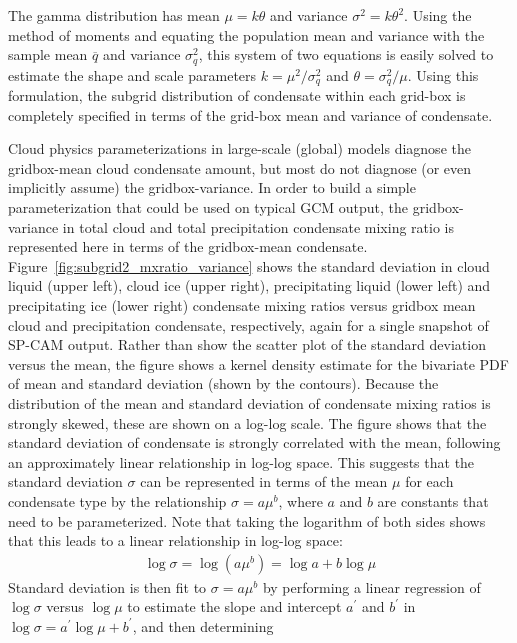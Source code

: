 The gamma distribution has mean \(\mu = k\theta\) and variance
\(\sigma^2 = k \theta^2\). Using the method of moments
\citep[e.g.;][]{wilks_2011} and equating the population mean and
variance with the sample mean \(\overline{q}\) and variance
\(\sigma_q^2\), this system of two equations is easily solved to
estimate the shape and scale parameters \(k = \mu^2 / \sigma_q^2\) and
\(\theta = \sigma_q^2 / \mu\). Using this formulation, the subgrid
distribution of condensate within each grid-box is completely specified
in terms of the grid-box mean and variance of condensate.

Cloud physics parameterizations in large-scale (global) models diagnose
the gridbox-mean cloud condensate amount, but most do not diagnose (or
even implicitly assume) the gridbox-variance. In order to build a simple
parameterization that could be used on typical GCM output, the
gridbox-variance in total cloud and total precipitation condensate
mixing ratio is represented here in terms of the gridbox-mean
condensate. Figure~\ref{fig:subgrid2_mxratio_variance} shows the
standard deviation in cloud liquid (upper left), cloud ice (upper
right), precipitating liquid (lower left) and precipitating ice (lower
right) condensate mixing ratios versus gridbox mean cloud and
precipitation condensate, respectively, again for a single snapshot of
SP-CAM output. Rather than show the scatter plot of the standard
deviation versus the mean, the figure shows a kernel density estimate
for the bivariate PDF of mean and standard deviation (shown by the
contours). Because the distribution of the mean and standard deviation
of condensate mixing ratios is strongly skewed, these are shown on a
log-log scale. The figure shows that the standard deviation of
condensate is strongly correlated with the mean, following an
approximately linear relationship in log-log space. This suggests that
the standard deviation \(\sigma\) can be represented in terms of the
mean \(\mu\) for each condensate type by the relationship
\(\sigma = a \mu^b\), where \(a\) and \(b\) are constants that need to
be parameterized. Note that taking the logarithm of both sides shows
that this leads to a linear relationship in log-log space:
\[\begin{gathered} 
    \log \sigma = \log(a \mu^b) = \log a + b\log \mu
\end{gathered}\] Standard deviation is then fit to \(\sigma = a \mu^b\)
by performing a linear regression of \(\log\sigma\) versus \(\log \mu\)
to estimate the slope and intercept \(a^{\prime}\) and \(b^{\prime}\) in
\(\log \sigma = a^{\prime} \log \mu + b^{\prime}\), and then determining
